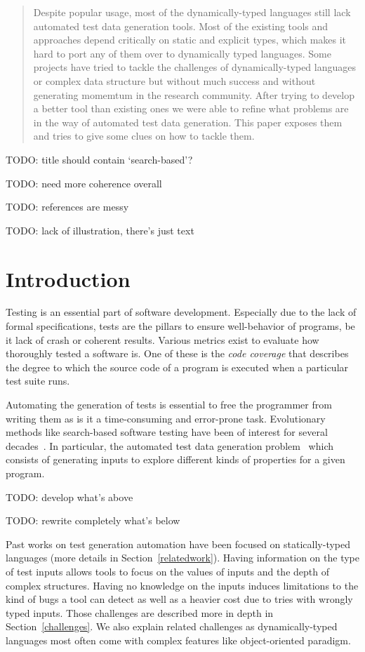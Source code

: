 \documentclass{llncs2e/llncs}
\makeatletter
\def\todo#1{{\color{red}TODO\@: #1}}
\makeatother
\begin{document}
\vfill

\begin{abstract}
Despite popular usage, most of the dynamically-typed languages still lack
automated test data generation tools. Most of the existing tools and approaches
depend critically on static and explicit types, which makes it hard to port any
of them over to dynamically typed languages. Some projects have tried to tackle
the challenges of dynamically-typed languages or complex data structure but
without much success and without generating momemtum in the research community.
After trying to develop a better tool than existing ones we were able to refine
what problems are in the way of automated test data generation. This paper
exposes them and tries to give some clues on how to tackle them.
\end{abstract}
%
\newpage

\todo{title should contain `search-based'?}

\todo{need more coherence overall}

\todo{references are messy}

\todo{lack of illustration, there's just text}
\section{Introduction}

Testing is an essential part of software development. Especially due to the lack
of formal specifications, tests are the pillars to ensure well-behavior of
programs, be it lack of crash or coherent results. Various metrics exist to
evaluate how thoroughly tested a software is. One of these is the \textit{code
coverage} that describes the degree to which the source code of a program is
executed when a particular test suite runs.

Automating the generation of tests is essential to free the programmer from
writing them as is it a time-consuming and error-prone task. Evolutionary
methods like search-based software testing have been of interest for several
decades~\cite{miller1976automatic}. In particular, the automated test data
generation problem~\cite{korel1990automated} which consists of generating inputs
to explore different kinds of properties for a given program.

\todo{develop what's above}

\todo{rewrite completely what's below}

Past works on test generation automation have been focused on statically-typed
languages (more details in Section~\ref{relatedwork}). Having information on the
type of test inputs allows tools to focus on the values of inputs and the depth
of complex structures. Having no knowledge on the inputs induces limitations to
the kind of bugs a tool can detect as well as a heavier cost due to tries with
wrongly typed inputs. Those challenges are described more in depth in
Section~\ref{challenges}. We also explain related challenges as
dynamically-typed languages most often come with complex features like
object-oriented paradigm.
\end{document}
